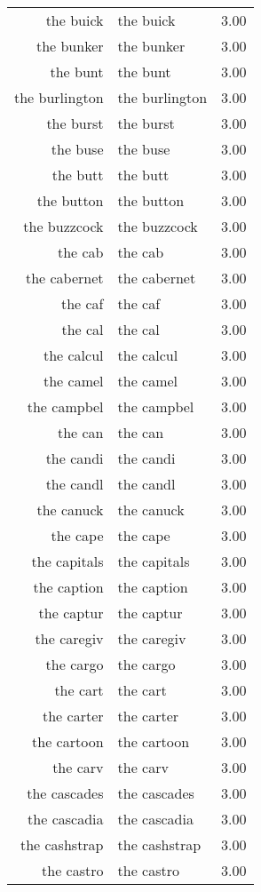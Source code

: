 \begin{table}[ht]
\begin{tabular}{rlr}
  the buick & the buick & 3.00 \\ 
  the bunker & the bunker & 3.00 \\ 
  the bunt & the bunt & 3.00 \\ 
  the burlington & the burlington & 3.00 \\ 
  the burst & the burst & 3.00 \\ 
  the buse & the buse & 3.00 \\ 
  the butt & the butt & 3.00 \\ 
  the button & the button & 3.00 \\ 
  the buzzcock & the buzzcock & 3.00 \\ 
  the cab & the cab & 3.00 \\ 
  the cabernet & the cabernet & 3.00 \\ 
  the caf & the caf & 3.00 \\ 
  the cal & the cal & 3.00 \\ 
  the calcul & the calcul & 3.00 \\ 
  the camel & the camel & 3.00 \\ 
  the campbel & the campbel & 3.00 \\ 
  the can & the can & 3.00 \\ 
  the candi & the candi & 3.00 \\ 
  the candl & the candl & 3.00 \\ 
  the canuck & the canuck & 3.00 \\ 
  the cape & the cape & 3.00 \\ 
  the capitals & the capitals & 3.00 \\ 
  the caption & the caption & 3.00 \\ 
  the captur & the captur & 3.00 \\ 
  the caregiv & the caregiv & 3.00 \\ 
  the cargo & the cargo & 3.00 \\ 
  the cart & the cart & 3.00 \\ 
  the carter & the carter & 3.00 \\ 
  the cartoon & the cartoon & 3.00 \\ 
  the carv & the carv & 3.00 \\ 
  the cascades & the cascades & 3.00 \\ 
  the cascadia & the cascadia & 3.00 \\ 
  the cashstrap & the cashstrap & 3.00 \\ 
  the castro & the castro & 3.00 \\ 

\end{tabular}
\end{table}
